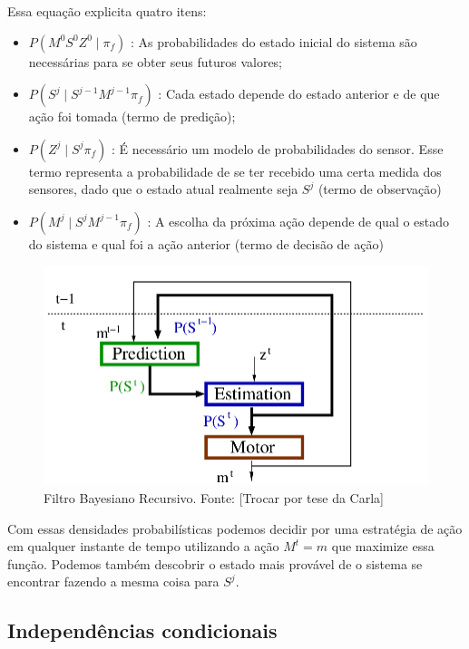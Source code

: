 Essa equação explicita quatro itens:

\begin{itemize}
  \item $ P \left( M^0 S^0 Z^0 \mid \pi_f \right) $ : As probabilidades do estado inicial do sistema são necessárias para se obter seus futuros valores;
  \item $ P \left( S^j \mid S^{j-1} M^{j-1} \pi_f \right) $ : Cada estado depende do estado anterior e de que ação foi tomada (termo de predição);
  \item $ P \left( Z^j \mid S^j \pi_f \right) $ : É necessário um modelo de probabilidades do sensor. Esse termo representa a probabilidade de se ter recebido uma certa medida dos sensores, dado que o estado atual realmente seja $ S^j $ (termo de observação)
  \item $ P \left( M^j \mid S^j M^{j-1} \pi_f \right) $ : A escolha da próxima ação depende de qual o estado do sistema e qual foi a ação anterior (termo de decisão de ação)
\end{itemize}

\begin{figure}[h]
    \centering
    \includegraphics[width=120mm]{images/modelo_bayesiano-Carla}
    \caption{\label{img:ModeloProbabilisticoCarla}Filtro Bayesiano Recursivo. Fonte: \cite{INCA2005} [Trocar por tese da Carla]}
\end{figure}

Com essas densidades probabilísticas podemos decidir por uma estratégia de ação em qualquer instante de tempo utilizando a ação $ M^t = m $ que maximize essa função. Podemos também descobrir o estado mais provável de o sistema se encontrar fazendo a mesma coisa para $ S^j $.


\subsection{Independências condicionais}

